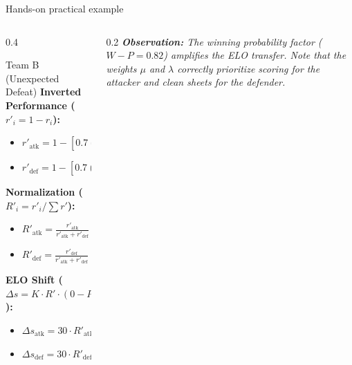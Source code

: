 \documentclass[10pt, aspectratio=169]{beamer}
\begin{document}
\begin{frame}{Hands-on practical example}
\begin{columns}[T]
        \begin{column}{0.4\textwidth}
            \begin{alertblock}{Team B (Unexpected Defeat)}
                \tiny
                \textbf{Inverted Performance ($r'_i = 1 - r_i$):}
                \begin{itemize}
                    \item $r'_{\text{atk}} = 1 - [0.7(\frac{1}{3}) + 0.3(0)] = 0.767$
                    \item $r'_{\text{def}} = 1 - [0.7(0) + 0.3(\frac{0}{3})] = 0 \rightarrow r'_{\text{def}} = 0.1$
                \end{itemize}
                
                \textbf{Normalization ($R'_i = r'_i / \sum r'$):}
                \begin{itemize}
                    \item $R'_{\text{atk}} = \frac{r'_{\text{atk}}}{r'_{\text{atk}} + r'_{\text{def}}} = 0.46$
					\item $R'_{\text{def}} = \frac{r'_{\text{def}}}{r'_{\text{atk}} + r'_{\text{def}}} = 0.54$
                \end{itemize}
                
                \textbf{ELO Shift ($\Delta s = K \cdot R' \cdot (0 - P_B)$):}
                \begin{itemize}
                    \item $\Delta s_{\text{atk}} = 30 \cdot R'_{\text{atk}} \cdot (-0.82) = \mathbf{-11.32}$
                    \item $\Delta s_{\text{def}} = 30 \cdot R'_{\text{def}} \cdot (-0.82) = \mathbf{-13.28}$
                \end{itemize}
            \end{alertblock}
        \end{column}
    
		\begin{column}{0.2\textwidth}
    \textit{\tiny \textbf{Observation:} The winning probability factor ($W-P = 0.82$) amplifies the ELO transfer. Note that the weights $\mu$ and $\lambda$ correctly prioritize scoring for the attacker and clean sheets for the defender.}
    		\end{column}
    
    \end{columns}
    
\end{frame}
\end{document}
